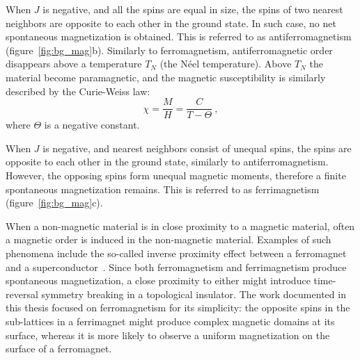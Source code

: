When $J$ is negative, and all the spins are equal in size, the spins of two nearest neighbors are opposite to each other in the ground state. In such case, no net spontaneous magnetization is obtained. This is referred to as antiferromagnetism (figure~\ref{fig:bg_mag}b). Similarly to ferromagnetism, antiferromagnetic order disappears above a temperature $T_N$ (the N\'eel temperature). Above $T_N$ the material become paramagnetic, and the magnetic susceptibility is similarly described by the Curie-Weiss law:%
\begin{equation}%
    \chi = \frac{M}{H} = \frac{C}{T - \Theta}~,%
\end{equation}%
where $\Theta$ is a negative constant.

When $J$ is negative, and nearest neighbors consist of unequal spins, the spins are opposite to each other in the ground state, similarly to antiferromagnetism. However, the opposing spins form unequal magnetic moments, therefore a finite spontaneous magnetization remains. This is referred to as ferrimagnetism (figure~\ref{fig:bg_mag}c).

When a non-magnetic material is in close proximity to a magnetic material, often a magnetic order is induced in the non-magnetic material. Examples of such phenomena include the so-called inverse proximity effect between a ferromagnet and a superconductor~\cite{Xia2009, Kalcheim2015}. Since both ferromagnetism and ferrimagnetism produce spontaneous magnetization, a close proximity to either might introduce time-reversal symmetry breaking in a topological insulator. The work documented in this thesis focused on ferromagnetism for its simplicity: the opposite spins in the sub-lattices in a ferrimagnet might produce complex magnetic domains at its surface, whereas it is more likely to observe a uniform magnetization on the surface of a ferromagnet.
